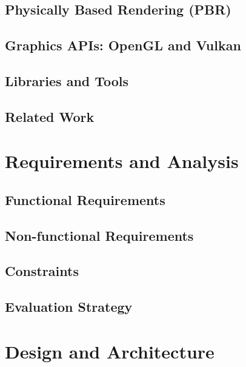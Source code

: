 \documentclass[12pt,a4paper,openright,twoside]{book}
\begin{document}
\section{Physically Based Rendering (PBR)}

\section{Graphics APIs: OpenGL and Vulkan}

\section{Libraries and Tools}

\section{Related Work}

\chapter{Requirements and Analysis}
\label{chap:analysis}

\section{Functional Requirements}

\section{Non-functional Requirements}

\section{Constraints}

\section{Evaluation Strategy}

\chapter{Design and Architecture}
\label{chap:design}
\end{document}
